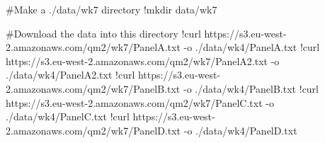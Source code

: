\documentclass[
  letterpaper,
  DIV=11,
  numbers=noendperiod]{scrreprt}
\newenvironment{Shaded}{\begin{snugshade}}{\end{snugshade}}
\newcommand{\CommentTok}[1]{\textcolor[rgb]{0.37,0.37,0.37}{#1}}
\newcommand{\ErrorTok}[1]{\textcolor[rgb]{0.68,0.00,0.00}{#1}}
\newcommand{\FloatTok}[1]{\textcolor[rgb]{0.68,0.00,0.00}{#1}}
\newcommand{\NormalTok}[1]{\textcolor[rgb]{0.00,0.23,0.31}{#1}}
\newcommand{\OperatorTok}[1]{\textcolor[rgb]{0.37,0.37,0.37}{#1}}
\begin{document}
\begin{Shaded}
\begin{Highlighting}[]
\CommentTok{\#Make a ./data/wk7 directory}
\OperatorTok{!}\NormalTok{mkdir data}\OperatorTok{/}\NormalTok{wk7}

\CommentTok{\#Download the data into this directory}
\OperatorTok{!}\NormalTok{curl https:}\OperatorTok{//}\NormalTok{s3.eu}\OperatorTok{{-}}\NormalTok{west}\OperatorTok{{-}}\FloatTok{2.}\ErrorTok{amazonaws}\NormalTok{.com}\OperatorTok{/}\NormalTok{qm2}\OperatorTok{/}\NormalTok{wk7}\OperatorTok{/}\NormalTok{PanelA.txt }\OperatorTok{{-}}\NormalTok{o .}\OperatorTok{/}\NormalTok{data}\OperatorTok{/}\NormalTok{wk4}\OperatorTok{/}\NormalTok{PanelA.txt}
\OperatorTok{!}\NormalTok{curl https:}\OperatorTok{//}\NormalTok{s3.eu}\OperatorTok{{-}}\NormalTok{west}\OperatorTok{{-}}\FloatTok{2.}\ErrorTok{amazonaws}\NormalTok{.com}\OperatorTok{/}\NormalTok{qm2}\OperatorTok{/}\NormalTok{wk7}\OperatorTok{/}\NormalTok{PanelA2.txt }\OperatorTok{{-}}\NormalTok{o .}\OperatorTok{/}\NormalTok{data}\OperatorTok{/}\NormalTok{wk4}\OperatorTok{/}\NormalTok{PanelA2.txt}
\OperatorTok{!}\NormalTok{curl https:}\OperatorTok{//}\NormalTok{s3.eu}\OperatorTok{{-}}\NormalTok{west}\OperatorTok{{-}}\FloatTok{2.}\ErrorTok{amazonaws}\NormalTok{.com}\OperatorTok{/}\NormalTok{qm2}\OperatorTok{/}\NormalTok{wk7}\OperatorTok{/}\NormalTok{PanelB.txt }\OperatorTok{{-}}\NormalTok{o .}\OperatorTok{/}\NormalTok{data}\OperatorTok{/}\NormalTok{wk4}\OperatorTok{/}\NormalTok{PanelB.txt}
\OperatorTok{!}\NormalTok{curl https:}\OperatorTok{//}\NormalTok{s3.eu}\OperatorTok{{-}}\NormalTok{west}\OperatorTok{{-}}\FloatTok{2.}\ErrorTok{amazonaws}\NormalTok{.com}\OperatorTok{/}\NormalTok{qm2}\OperatorTok{/}\NormalTok{wk7}\OperatorTok{/}\NormalTok{PanelC.txt }\OperatorTok{{-}}\NormalTok{o .}\OperatorTok{/}\NormalTok{data}\OperatorTok{/}\NormalTok{wk4}\OperatorTok{/}\NormalTok{PanelC.txt}
\OperatorTok{!}\NormalTok{curl https:}\OperatorTok{//}\NormalTok{s3.eu}\OperatorTok{{-}}\NormalTok{west}\OperatorTok{{-}}\FloatTok{2.}\ErrorTok{amazonaws}\NormalTok{.com}\OperatorTok{/}\NormalTok{qm2}\OperatorTok{/}\NormalTok{wk7}\OperatorTok{/}\NormalTok{PanelD.txt }\OperatorTok{{-}}\NormalTok{o .}\OperatorTok{/}\NormalTok{data}\OperatorTok{/}\NormalTok{wk4}\OperatorTok{/}\NormalTok{PanelD.txt}
\end{Highlighting}
\end{Shaded}
\end{document}
